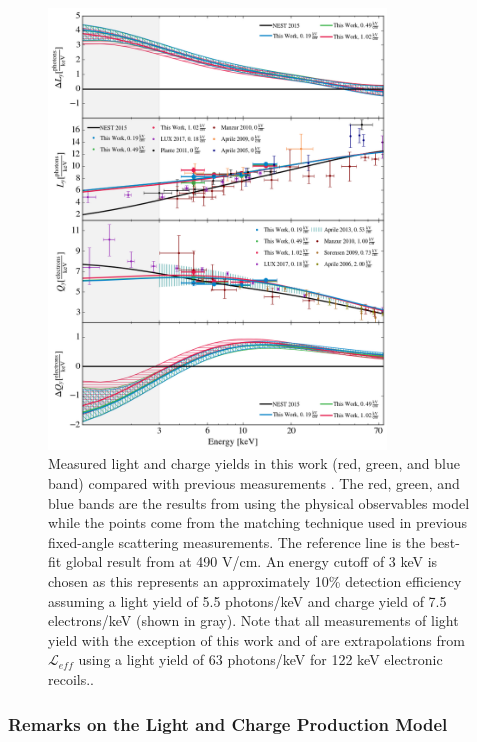 \begin{figure}[p]
        \centering
	\includegraphics[width=0.8\textwidth]{nerix_ly_qy}
	\caption{Measured light and charge yields in this work (red, green, and blue band) compared with previous measurements \cite{aprile2005scintillation,aprile2006simultaneous,sorensen2009scintillation,aprile2009new,manzur2010scintillation,horn2011nuclear,plante2011new, aprile2013response,akerib2016low}.  The red, green, and blue bands are the results from using the physical observables model while the points come from the matching technique used in previous fixed-angle scattering measurements.  The reference line is the best-fit global result from  at 490 V/cm.  An energy cutoff of 3 keV is chosen as this represents an approximately 10\% detection efficiency assuming a light yield of 5.5 photons/keV and charge yield of 7.5 electrons/keV (shown in gray).  Note that all measurements of light yield with the exception of this work and of  are extrapolations from $\mathcal{L}_{eff}$ using a light yield of 63 photons/keV for 122 keV electronic recoils..}
	\label{fig:nerix_ly_qy}
\end{figure}



\subsubsection{Remarks on the Light and Charge Production Model}

